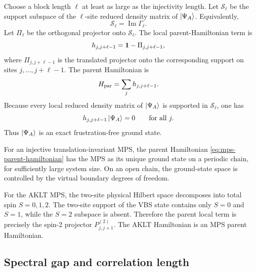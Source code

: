 Choose a block length \(\ell\) at least as large as the injectivity length.  Let
\(\mathcal{S}_\ell\) be the support subspace of the \(\ell\)-site reduced density
matrix of \(\left|\Psi_A\right\rangle\).  Equivalently,
\begin{equation}
\label{eq:mps-local-support-subspace}
    \mathcal{S}_\ell
    =
    \operatorname{Im}\Gamma_\ell .
\end{equation}
Let \(\Pi_\ell\) be the orthogonal projector onto \(\mathcal{S}_\ell\).  The local
parent-Hamiltonian term is
\begin{equation}
\label{eq:mps-parent-local-term}
    h_{j,j+\ell-1}
    =
    \mathbf{1}-\Pi_{j,j+\ell-1},
\end{equation}
where \(\Pi_{j,j+\ell-1}\) is the translated projector onto the corresponding
support on sites \(j,\ldots,j+\ell-1\).  The parent Hamiltonian is
\begin{equation}
\label{eq:mps-parent-hamiltonian}
    H_{\rm par}
    =
    \sum_j h_{j,j+\ell-1} .
\end{equation}
Because every local reduced density matrix of \(\left|\Psi_A\right\rangle\) is supported in
\(\mathcal{S}_\ell\), one has
\begin{equation}
\label{eq:mps-parent-annihilation}
    h_{j,j+\ell-1}\left|\Psi_A\right\rangle=0
    \qquad
    \text{for all }j .
\end{equation}
Thus \(\left|\Psi_A\right\rangle\) is an exact frustration-free ground state.

\begin{theorem}
For an injective translation-invariant MPS, the parent Hamiltonian
\cref{eq:mps-parent-hamiltonian} has the MPS as its unique ground state on a
periodic chain, for sufficiently large system size.  On an open chain, the
ground-state space is controlled by the virtual boundary degrees of freedom.
\end{theorem}

\begin{remark}
For the AKLT MPS, the two-site physical Hilbert space decomposes into total spin
\(S=0,1,2\).  The two-site support of the VBS state contains only \(S=0\) and
\(S=1\), while the \(S=2\) subspace is absent.  Therefore the parent local term
is precisely the spin-2 projector \(P_{j,j+1}^{(2)}\).  The AKLT Hamiltonian is
an MPS parent Hamiltonian.
\end{remark}

\subsection{Spectral gap and correlation length}
\label{subsec:mps-gap-correlation}

